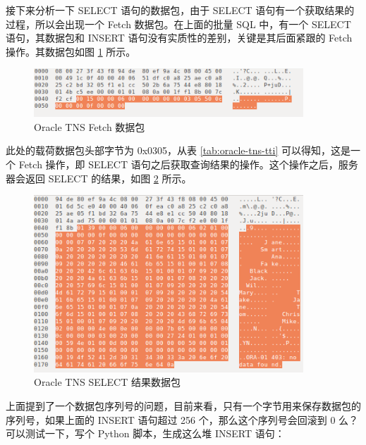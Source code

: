 接下来分析一下 {\cf SELECT} 语句的数据包，由于 {\cf SELECT} 语句有一个获取结果的过程，所以会出现一个 Fetch 数据包。在上面的批量 SQL 中，有一个 {\cf SELECT} 语句，其数据包和 {\cf INSERT} 语句没有实质性的差别，关键是其后面紧跟的 Fetch 操作。其数据包如图 \ref{fig:tns-fetch} 所示。

\begin{figure}[ht!]
    \caption{Oracle TNS Fetch 数据包}
    \label{fig:tns-fetch}
    \centering
    \includegraphics[width=0.9\textwidth]{tns-fetch.png}
\end{figure}

此处的载荷数据包头部字节为 {\cf 0x0305}，从表 \ref{tab:oracle-tns-tti} 可以得知，这是一个 Fetch 操作，即 {\cf SELECT} 语句之后获取查询结果的操作。这个操作之后，服务器会返回 {\cf SELECT} 的结果，如图 \ref{fig:tns-select-result} 所示。

\begin{figure}[ht!]
    \caption{Oracle TNS SELECT 结果数据包}
    \label{fig:tns-select-result}
    \centering
    \includegraphics[width=0.9\textwidth]{tns-select-result.png}
\end{figure}

上面提到了一个数据包序列号的问题，目前来看，只有一个字节用来保存数据包的序列号，如果上面的 {\cf INSERT} 语句超过 256 个，那么这个序列号会回滚到 0 么？可以测试一下，写个 Python 脚本，生成这么堆 {\cf INSERT} 语句：



